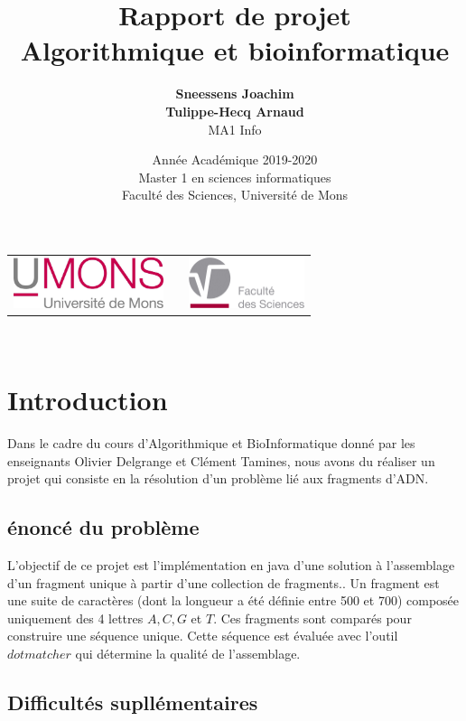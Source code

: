 \documentclass{article}
\title{
{\Huge \textbf{Rapport de projet}\\
Algorithmique et bioinformatique}}
\author{\textbf{Sneessens Joachim}\\\textbf{Tulippe-Hecq Arnaud}\\MA1 Info}
\date{Année Académique 2019-2020\\
Master 1 en sciences informatiques\\
\vspace{1cm}
Faculté des Sciences, Université de Mons}
\begin{document}
\maketitle

\vspace{9cm}

\begin{center}
\begin{tabular}[t]{c c c}
\includegraphics[height=1.5cm]{logoumons.jpg} &
\hspace{1cm} &
\includegraphics[height=1.5cm]{logofs.jpg}
\end{tabular}
\end{center}~\\



\newpage

\section{Introduction}

Dans le cadre du cours d'Algorithmique et BioInformatique donné par les enseignants Olivier Delgrange et Clément Tamines, nous avons du réaliser un projet qui consiste en la résolution d'un problème lié aux fragments d'ADN.

\subsection{énoncé du problème}

L'objectif de ce projet est l'implémentation en java d'une solution à l'assemblage d'un fragment unique à partir d'une collection de fragments.. Un fragment est une suite de caractères (dont la longueur a été définie entre 500 et 700) composée uniquement des 4 lettres $ A, C, G $ et $T$. Ces fragments sont comparés pour construire une séquence unique. Cette séquence est évaluée avec l'outil $dotmatcher$ qui détermine la qualité de l'assemblage.


\subsection{Difficultés supllémentaires}
\end{document}
